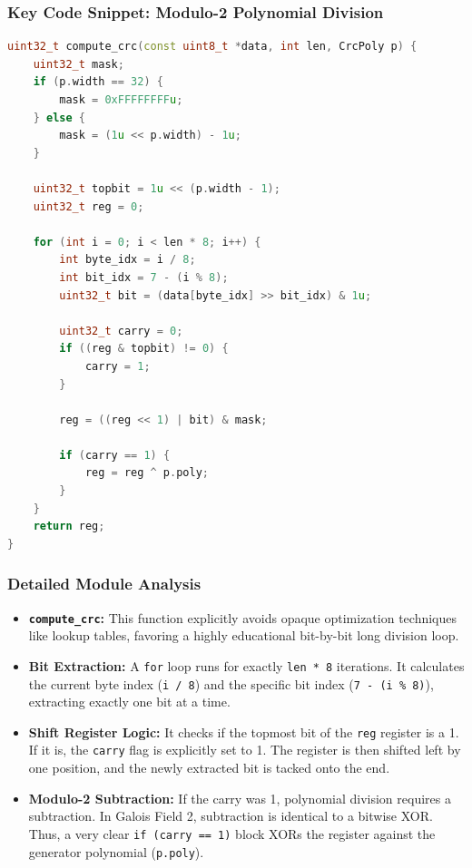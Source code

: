 \documentclass[12pt, a4paper]{article}
\begin{document}
\subsubsection{Key Code Snippet: Modulo-2 Polynomial Division}
\begin{lstlisting}[language=C++]
uint32_t compute_crc(const uint8_t *data, int len, CrcPoly p) {
    uint32_t mask;
    if (p.width == 32) {
        mask = 0xFFFFFFFFu;
    } else {
        mask = (1u << p.width) - 1u;
    }
    
    uint32_t topbit = 1u << (p.width - 1);
    uint32_t reg = 0;

    for (int i = 0; i < len * 8; i++) {
        int byte_idx = i / 8;
        int bit_idx = 7 - (i % 8);
        uint32_t bit = (data[byte_idx] >> bit_idx) & 1u;
        
        uint32_t carry = 0;
        if ((reg & topbit) != 0) {
            carry = 1;
        }
        
        reg = ((reg << 1) | bit) & mask;
        
        if (carry == 1) {
            reg = reg ^ p.poly;
        }
    }
    return reg;
}
\end{lstlisting}

\subsubsection{Detailed Module Analysis}
\begin{itemize}
    \item \textbf{\texttt{compute\_crc}:} This function explicitly avoids opaque optimization techniques like lookup tables, favoring a highly educational bit-by-bit long division loop. 
    \item \textbf{Bit Extraction:} A \texttt{for} loop runs for exactly \texttt{len * 8} iterations. It calculates the current byte index (\texttt{i / 8}) and the specific bit index (\texttt{7 - (i \% 8)}), extracting exactly one bit at a time.
    \item \textbf{Shift Register Logic:} It checks if the topmost bit of the \texttt{reg} register is a 1. If it is, the \texttt{carry} flag is explicitly set to 1. The register is then shifted left by one position, and the newly extracted bit is tacked onto the end. 
    \item \textbf{Modulo-2 Subtraction:} If the carry was 1, polynomial division requires a subtraction. In Galois Field 2, subtraction is identical to a bitwise XOR. Thus, a very clear \texttt{if (carry == 1)} block XORs the register against the generator polynomial (\texttt{p.poly}). 
\end{itemize}
\end{document}
